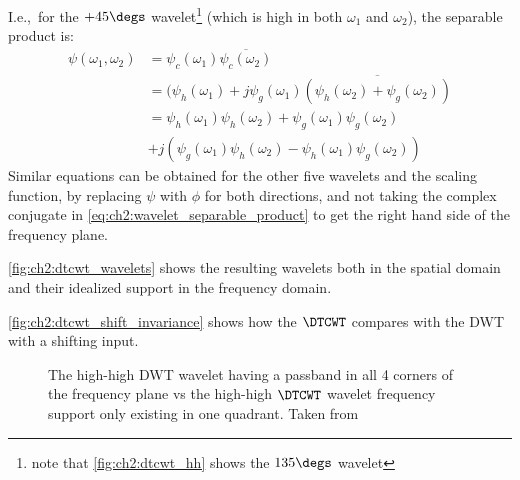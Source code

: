   I.e.,\ for the $+45\degs$ wavelet\footnote{note that \autoref{fig:ch2:dtcwt_hh}
  shows the $135\degs$ wavelet} (which is high
  in both $\omega_1$ and $\omega_2$), the separable product is:
  \begin{align}
    \psi(\omega_1,\omega_2) & =  \psi_c (\omega_1) \overline{\psi_c
      (\omega_2) } \label{eq:ch2:wavelet_separable_product}\\
    & =  (\psi_h(\omega_1) + j \psi_g(\omega_1) \overline{\left(\psi_h(\omega_2)
      + \psi_g(\omega_2) \right)} \nonumber\\
    & =  \psi_h(\omega_1) \psi_h(\omega_2) + \psi_g(\omega_1)
      \psi_g(\omega_2)\nonumber\\
    &  + j\left( \psi_g(\omega_1) \psi_h(\omega_2) - \psi_h(\omega_1)
        \psi_g(\omega_2) \right)  \label{eq:ch2:dtcwt_2d_product}
  \end{align}
  Similar equations can be obtained for the other five wavelets and the scaling
  function, by replacing
  $\psi$ with $\phi$ for both directions, and not taking the complex conjugate
  in \eqref{eq:ch2:wavelet_separable_product} to get the right hand side of the
  frequency plane. 
  
  \autoref{fig:ch2:dtcwt_wavelets} shows the resulting wavelets both in the spatial
  domain and their idealized support in the frequency domain.

  \autoref{fig:ch2:dtcwt_shift_invariance} shows how the $\DTCWT$ compares with the
  DWT with a shifting input.

  \begin{figure}
      \newline
      \caption[The DWT high-high vs the $\DTCWT$ high-high frequency support]
              { The high-high DWT wavelet having a passband in
              all 4 corners of the frequency plane vs  the
              high-high $\DTCWT$ wavelet frequency support only existing in one
              quadrant. Taken from \cite{selesnick_dual-tree_2005}}
      \label{fig:ch2:dwt_dtcwt_hh}
  \end{figure}

